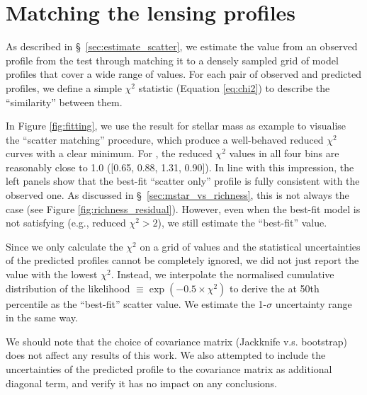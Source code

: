 \documentclass[fleqn,usenatbib,useAMS]{mnras}
\begin{document}
\section{Matching the lensing profiles}
    \label{app:fitting}

    As described in \S\ \ref{sec:estimate_scatter}, we estimate the \sigmh{} value
    from an observed \dsigma{} profile from the \topn{} test through matching it to a densely
    sampled grid of model \dsigma{} profiles that cover a wide range of \sigmh{}
    values.
    For each pair of observed and predicted \dsigma{} profiles, we define a simple $\chi^2$
    statistic (Equation \ref{eq:chi2}) to describe the ``similarity'' between them.

    In Figure \ref{fig:fitting}, we use the \topn{} result for  stellar mass as example
    to visualise the ``scatter matching'' procedure, which produce a well-behaved reduced $\chi^2$
    curves with a clear minimum.
    For , the reduced $\chi^2$ values in all four \topn{} bins are reasonably close
    to 1.0 ([0.65, 0.88, 1.31, 0.90]).
    In line with this impression, the left panels show that the best-fit ``scatter only'' \dsigma{}
    profile is fully consistent with the observed one.
    As discussed in \S\ \ref{sec:mstar_vs_richness}, this is not always the case (see
    Figure \ref{fig:richness_residual}).
    However, even when the best-fit model is not satisfying (e.g., reduced $\chi^2 >2$), we still
    estimate the ``best-fit'' \sigmh{} value.

    Since we only calculate the $\chi^2$ on a grid of \sigmh{} values and the statistical
    uncertainties of the predicted \dsigma{} profiles cannot be completely ignored, we did not
    just report the \sigmh{} value with the lowest $\chi^2$.
    Instead, we interpolate the normalised cumulative distribution of the likelihood $\equiv
    \exp{(-0.5 \times \chi^2)}$ to derive the \sigmh{} at 50th percentile as the ``best-fit''
    scatter value.
    We estimate the 1-$\sigma$ uncertainty range in the same way.

    We should note that the choice of covariance matrix (Jackknife v.s. bootstrap) does not
    affect any results of this work.
    We also attempted to include the uncertainties of the predicted \dsigma{} profile to the
    covariance matrix as additional diagonal term, and verify it has no impact on any
    conclusions.
\end{document}
